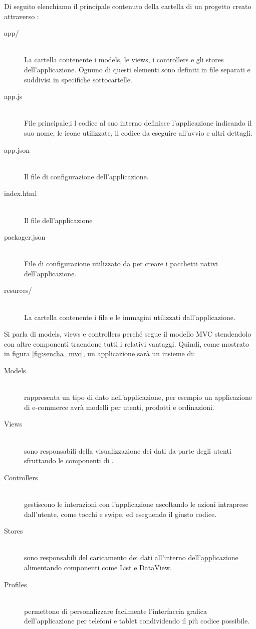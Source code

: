 			Di seguito elenchiamo il principale contenuto della cartella di un
			progetto creato attraverso \senchacmd{}:
			\begin{description}
				\item[app/]\hfill \\
					La cartella contenente i models, le views, i controllers e
					gli stores dell'applicazione. Ognuno di questi elementi sono
					definiti in file \js{} separati e suddivisi in specifiche
					sottocartelle.
				\item[app.js]\hfill \\
					File \js{} principale;i l codice al	suo interno definisce
					l'applicazione indicando il suo nome, le icone utilizzate,
					il codice da eseguire all'avvio e altri	dettagli. 
				\item[app.json]\hfill \\
					Il file di configurazione dell'applicazione.
				\item[index.html]\hfill \\
					Il file \html{} dell'applicazione
				\item[packager.json]\hfill \\
					File di configurazione utilizzato da \senchacmd{} per creare
					i pacchetti nativi dell'applicazione.
				\item[resurces/]\hfill \\
					La cartella contenente i file \css{} e le immagini utilizzati
					dall'applicazione.
			\end{description}
			Si parla di models, views e controllers perché \senchat{} segue
			il modello MVC stendendolo con altre componenti traendone tutti i
			relativi vantaggi. Quindi, come mostrato in figura \ref{fig:sencha_mvc},
			un applicazione sarà un insieme di:
			\begin{description}
				\item[Models]\hfill \\
					rappresenta un tipo di dato nell'applicazione, per esempio un
					applicazione di e-commerce avrà modelli per utenti, prodotti
					e ordinazioni.
				\item[Views]\hfill \\
					sono responsabili della visualizzazione dei dati da parte
					degli utenti sfruttando le componenti di \senchat{}.
				\item[Controllers]\hfill \\
					gestiscono le interazioni con l'applicazione ascoltando le
					azioni intraprese dall'utente, come tocchi e swipe, ed eseguendo
					il giusto codice.
				\item[Stores]\hfill \\
					sono responsabili del caricamento dei dati all'interno
					dell'applicazione alimentando componenti come List e DataView.
				\item[Profiles]\hfill \\
					permettono di personalizzare facilmente l'interfaccia grafica
					dell'applicazione per telefoni e tablet condividendo il più
					codice possibile.
			\end{description}
